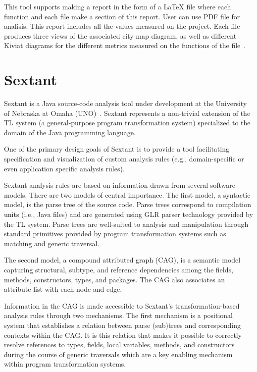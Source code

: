 This tool supports making a report in the form of a LaTeX file where each function and each file make a section of this report. User can use PDF file for analisis. This report includes all the values measured on the project. Each file produces three views of the associated city map diagram, as well as different Kiviat diagrams for the different metrics measured on the functions of the file~\cite{metrix}. 

\section{Sextant}

Sextant is a Java source-code analysis tool under development at the University of Nebraska at Omaha (UNO)~\cite{sextant}. Sextant represents a non-trivial extension of the TL system (a general-purpose program
transformation system) specialized to the domain of the Java
programming language.

One of the primary design goals of Sextant is to provide a tool facilitating specification and visualization of custom analysis rules (e.g., domain-specific or even application specific analysis rules).

Sextant analysis rules are based on information drawn from several software models. There are two models of central importance. The first model, a syntactic model, is the parse tree of the source code. Parse trees correspond
to compilation units (i.e., Java files) and are generated using GLR parser technology provided by the TL system. Parse trees are well-suited to analysis and manipulation through standard primitives provided by program transformation systems such as matching and generic traversal.

The second model, a compound attributed graph (CAG), is a semantic model capturing structural, subtype, and reference dependencies among the fields, methods, constructors, types, and packages. The CAG also associates an attribute list with each node and edge.

Information in the CAG is made accessible to Sextant’s transformation-based analysis rules through two mechanisms. The first mechanism is a positional system that establishes a relation between parse (sub)trees and corresponding contexts within the CAG. It is this relation that makes it possible to
correctly resolve references to types, fields, local variables, methods, and constructors during the course of generic traversals which are a key enabling mechanism within program transformation systems.

